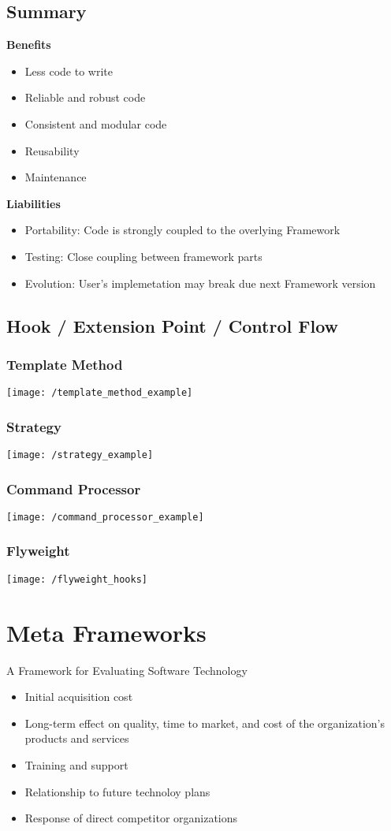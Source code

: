 \subsection{Summary}
\textbf{Benefits}
\begin{itemize}[topsep=0pt]
    \itemsep -0.4em
    \item Less code to write
    \item Reliable and robust code
    \item Consistent and modular code
    \item Reusability
    \item Maintenance
\end{itemize}
\textbf{Liabilities}
\begin{itemize}[topsep=0pt]
    \itemsep -0.4em
    \item Portability: Code is strongly coupled to the overlying Framework 
    \item Testing: Close coupling between framework parts
    \item Evolution: User's implemetation may break due next Framework version
\end{itemize}

\subsection{Hook / Extension Point / Control Flow}
\subsubsection{Template Method}
\texttt{[image: /template\_method\_example]}
\subsubsection{Strategy}
\texttt{[image: /strategy\_example]}
\subsubsection{Command Processor}
\texttt{[image: /command\_processor\_example]}
\subsubsection{Flyweight}
\texttt{[image: /flyweight\_hooks]}



\section{Meta Frameworks}
A Framework for Evaluating Software Technology
\begin{itemize}[topsep=0pt]
    \itemsep -0.4em
    \item Initial acquisition cost
    \item Long-term effect on quality, time to market, and cost of the organization’s products and services
    \item Training and support
    \item Relationship to future technoloy plans
    \item Response of direct competitor organizations
\end{itemize}

